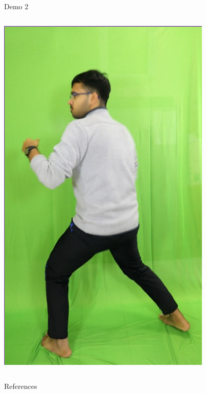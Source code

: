 \begin{frame}{Demo 2}
\begin{columns}
\begin{center}
            \href{run:videos/shashank_correct_timing.mp4}{\includegraphics[scale=0.2]{imgs/shashank.png}} 
        \end{center}
    \end{columns}   
\end{frame}

\begin{frame}{References}
    
    
\end{frame}


        
        

